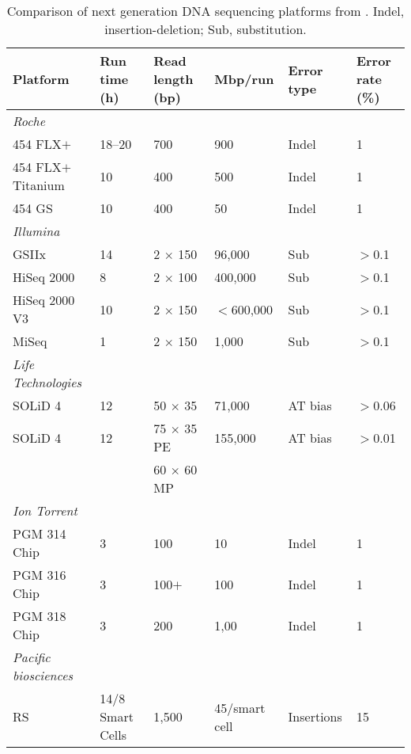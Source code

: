 \begin{table}
\footnotesize
\caption[Comparison of next generation \textsc{DNA} sequencing platforms]{Comparison of next generation \textsc{DNA} sequencing platforms from \citet{Schlotz2012}. Indel, insertion-deletion; Sub, substitution.
}
\label{tab:seq_tech}
\smallskip
\begin{tabularx}{\textwidth}{p{3cm}p{2.5cm}XXp{1.5cm}p{1.2cm}}
\toprule
\textbf{Platform} & \textbf{Run time (h)} & \textbf{Read length (bp)} & \textbf{Mbp/run} & \textbf{Error type} & \textbf{Error rate (\%)} \\
\midrule
\emph{Roche}             &        &                   &            &              &   \\
454 FLX$+$               & 18--20 & 700               & 900        & Indel        & 1 \\
454 FLX$+$ Titanium      &  10    & 400               & 500        & Indel        & 1 \\
454 GS                   &  10    & 400               & 50         & Indel        & 1 \\
\emph{Illumina}          &        &                   &            &              &  \\
GSIIx                    & 14     & 2 $\times$ 150    & 96,000     & Sub          & $>$0.1 \\
HiSeq 2000               & 8      & 2 $\times$ 100    & 400,000    & Sub          & $>$0.1 \\
HiSeq 2000 V3            & 10     & 2 $\times$ 150    & $<$600,000 & Sub          & $>$0.1 \\
MiSeq                    & 1      & 2 $\times$ 150    & 1,000      & Sub          & $>$0.1 \\
\emph{Life Technologies} &  &  &  &  &  \\
SOLiD 4                  & 12     & 50 $\times$ 35    & 71,000     & AT bias     & $>$0.06 \\
SOLiD 4                  & 12     & 75 $\times$ 35 PE & 155,000    & AT bias     & $>$0.01 \\
                         &        & 60 $\times$ 60 MP &            &             &  \\
\emph{Ion Torrent}       &        &                   &            &             &  \\
PGM 314 Chip             & 3      & 100               & 10         &  Indel      & 1 \\
PGM 316 Chip             & 3      & 100$+$            & 100        &  Indel      & 1 \\
PGM 318 Chip             & 3      & 200               & 1,00       &  Indel      & 1 \\
\emph{Pacific biosciences} &  &  &  &  &  \\
RS                       & 14/8 Smart Cells & 1,500 & 45/smart cell &  Insertions & 15 \\
\bottomrule
\end{tabularx}
\end{table}
